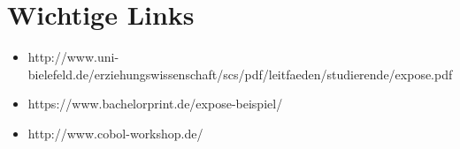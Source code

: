 \section*{Wichtige Links}
\begin{itemize}
\item http://www.uni-bielefeld.de/erziehungswissenschaft/scs/pdf/leitfaeden/studierende/expose.pdf
\item https://www.bachelorprint.de/expose-beispiel/
\item http://www.cobol-workshop.de/
\end{itemize}
